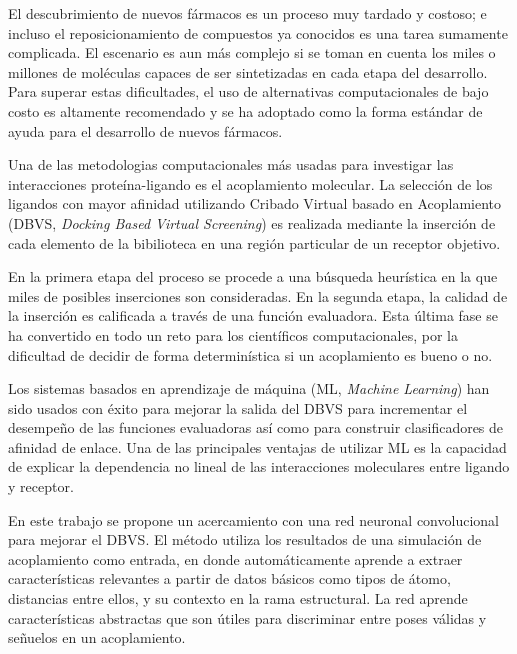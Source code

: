 El descubrimiento de nuevos fármacos es un proceso muy tardado y
costoso; e incluso el reposicionamiento de compuestos ya conocidos es
una tarea sumamente complicada. El escenario es aun más complejo si
se toman en cuenta los miles o millones de moléculas capaces de ser
sintetizadas en cada etapa del desarrollo.  Para superar estas
dificultades, el uso de alternativas computacionales de bajo costo es
altamente recomendado y se ha adoptado como la forma estándar de
ayuda para el desarrollo de nuevos fármacos.

Una de las metodologias computacionales más usadas para investigar las
interacciones proteína-ligando es el acoplamiento molecular. La
selección de los ligandos con mayor afinidad utilizando Cribado
Virtual basado en Acoplamiento (DBVS, \textit{Docking Based Virtual
  Screening}) es realizada mediante la inserción de cada elemento de
la bibilioteca en una región particular de un receptor objetivo.

En la primera etapa del proceso se procede a una búsqueda heurística
en la que miles de posibles inserciones son consideradas. En la
segunda etapa, la calidad de la inserción es calificada a través de
una función evaluadora. Esta última fase se ha convertido en todo un
reto para los científicos computacionales, por la dificultad de
decidir de forma determinística si un acoplamiento es bueno o no.

Los sistemas basados en aprendizaje de máquina (ML, \textit{Machine
  Learning}) han sido usados con éxito para mejorar la salida del DBVS
para incrementar el desempeño de las funciones evaluadoras así como
para construir clasificadores de afinidad de enlace. Una de las
principales ventajas de utilizar ML es la capacidad de explicar la
dependencia no lineal de las interacciones moleculares entre ligando y
receptor.

En este trabajo se propone un acercamiento con una red neuronal
convolucional para mejorar el DBVS. El método utiliza los resultados
de una simulación de acoplamiento como entrada, en donde
automáticamente aprende a extraer características relevantes a partir
de datos básicos como tipos de átomo, distancias entre ellos, y su
contexto en la rama estructural. La red aprende características
abstractas que son útiles para discriminar entre poses válidas y
señuelos en un acoplamiento.
